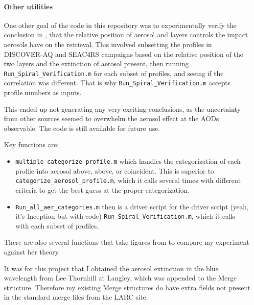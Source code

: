 \documentclass[12pt]{article}
\begin{document}
		\paragraph{Other utilities}
		
		One other goal of the code in this repository was to experimentally verify the conclusion in \citet{bousserez14}, that the relative position of aerosol and  layers controls the impact aerosols have on the  retrieval.  This involved subsetting the profiles in DISCOVER-AQ and SEAC4RS campaigns based on the relative position of the two layers and the extinction of aerosol present, then running \lstinline$Run_Spiral_Verification.m$ for each subset of profiles, and seeing if the correlation was different. That is why \lstinline$Run_Spiral_Verification.m$ accepts profile numbers as inputs.
		
		This ended up not generating any very exciting conclusions, as the uncertainty from other sources seemed to overwhelm the aerosol effect at the AODs observable. The code is still available for future use.
		
		Key functions are:
		\begin{itemize}
		\item \lstinline$multiple_categorize_profile.m$ which handles the categorization of each profile into aerosol above,  above, or coincident. This is superior to \lstinline$categorize_aerosol_profile.m$, which it calls several times with different criteria to get the best guess at the proper categorization.
		
		\item \lstinline$Run_all_aer_categories.m$ then is a driver script for the driver script (yeah, it's Inception but with code) \lstinline$Run_Spiral_Verification.m$, which it calls with each subset of profiles.
		\end{itemize}
		
		There are also several functions that take figures from \citet{leitao10} to compare my experiment against her theory.
		
		It was for this project that I obtained the aerosol extinction in the blue wavelength from Lee Thornhill at Langley, which was appended to the Merge structure. Therefore my existing Merge structures do have extra fields not present in the standard merge files from the LARC site.
		
\end{document}
